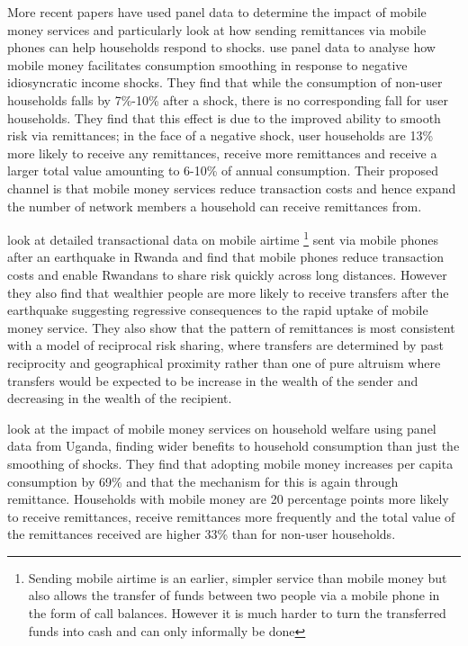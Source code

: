 More recent papers have used panel data to determine the impact of mobile money services and particularly look at how sending remittances via mobile phones can help households respond to shocks. \cite{JackSuri2014} use panel data to analyse how mobile money facilitates consumption smoothing in response to negative idiosyncratic income shocks. They find that while the consumption of non-user households falls by 7\%-10\% after a shock, there is no corresponding fall for user households. They find that this effect is due to the improved ability to smooth risk via remittances; in the face of a negative shock, user households are 13\% more likely to receive any remittances, receive more remittances and receive a larger total value amounting to 6-10\% of annual consumption. Their proposed channel is that mobile money services reduce transaction costs and hence expand the number of network members a household can receive remittances from.   

\cite{blumenstock2014evidence} look at detailed transactional data on mobile airtime \footnote{Sending mobile airtime is an earlier, simpler service than mobile money but also allows the transfer of funds between two people via a mobile phone in the form of call balances. However it is much harder to turn the transferred funds into cash and can only informally be done} sent via mobile phones after an earthquake in Rwanda and find that mobile phones reduce transaction costs and enable Rwandans to share risk quickly across long distances. However they also find that wealthier people are more likely to receive transfers after the earthquake suggesting regressive consequences to the rapid uptake of mobile money service. They also show that the pattern of remittances is most consistent with a model of reciprocal risk sharing, where transfers are determined by past reciprocity and geographical proximity rather than one of pure altruism where transfers would be expected to be increase in the wealth of the sender and decreasing in the wealth of the recipient.

\cite{munyegera2014} look at the impact of mobile money services on household welfare using panel data from Uganda, finding wider benefits to household consumption than just the smoothing of shocks. They find that adopting mobile money increases per capita consumption by 69\% and that the mechanism for this is again through remittance. Households with mobile money are 20 percentage points more likely to receive remittances, receive remittances more frequently and the total value of the remittances received are higher 33\% than for non-user households. 

